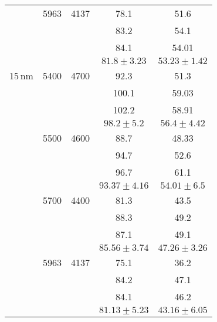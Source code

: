 \documentclass{article}
\begin{document}
\begin{table}
\begin{tabular}{|c|c|c|c|c|}
              &   5963   &  4137      & 78.1      &   51.6   \\
              &          &            & 83.2      &   54.1   \\
              &          &            & 84.1      &   54.01  \\
    \hline
            &            &            & $81.8 \pm 3.23$   & $53.23 \pm 1.42$ \\
    \hline
        15\,nm & 5400    &  4700      & 92.3     &   51.3   \\
               &         &            & 100.1    &   59.03  \\
               &         &            & 102.2    &   58.91  \\
    \hline
               &         &            & $98.2 \pm 5.2$ & $56.4 \pm 4.42$ \\
    \hline
               & 5500    &  4600      & 88.7    &   48.33   \\
               &         &            & 94.7    &   52.6    \\
               &         &            & 96.7    &   61.1    \\
    \hline
               &         &     & $93.37 \pm 4.16$ & $54.01 \pm 6.5$ \\
    \hline
               &  5700    &  4400      & 81.3     &  43.5  \\
               &          &            & 88.3     &  49.2  \\
               &          &            & 87.1     &  49.1  \\
    \hline
               &         &     & $85.56 \pm 3.74$ & $47.26 \pm 3.26$ \\
    \hline
               &   5963   &  4137      & 75.1      &  36.2  \\
               &          &            & 84.2      &  47.1  \\
               &          &            & 84.1      &  46.2  \\
    \hline
               &          &  & $81.13 \pm 5.23$  & $43.16 \pm 6.05$ \\
    \hline


\end{tabular}
\end{table}
\end{document}
